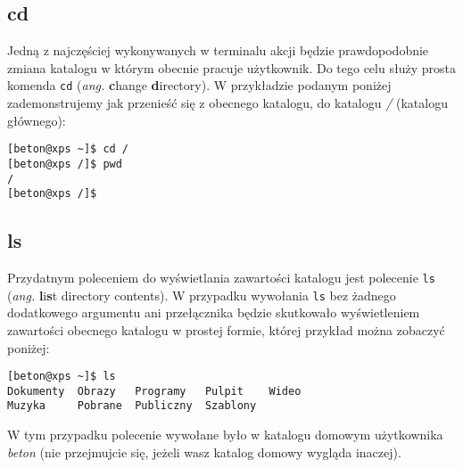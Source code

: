 \subsection{cd}
Jedną z najczęściej wykonywanych w terminalu akcji będzie prawdopodobnie zmiana katalogu w którym obecnie pracuje użytkownik. Do tego celu służy prosta komenda \texttt{cd} (\textit{ang.} \textbf{c}hange \textbf{d}irectory). W przykładzie podanym poniżej zademonstrujemy jak przenieść się z obecnego katalogu, do katalogu \textit{/} (katalogu głównego):
\begin{verbatim}
[beton@xps ~]$ cd /
[beton@xps /]$ pwd
/
[beton@xps /]$ 
\end{verbatim}

\subsection{ls}
\label{sec:ls}
Przydatnym poleceniem do wyświetlania zawartości katalogu jest polecenie \texttt{ls} (\textit{ang.} \textbf{l}i\textbf{s}t directory contents). W przypadku wywołania \texttt{ls} bez żadnego dodatkowego argumentu ani przełącznika będzie skutkowało wyświetleniem zawartości obecnego katalogu w prostej formie, której przykład można zobaczyć poniżej:
\begin{verbatim}
[beton@xps ~]$ ls
Dokumenty  Obrazy   Programy   Pulpit    Wideo
Muzyka     Pobrane  Publiczny  Szablony
\end{verbatim}
W tym przypadku polecenie wywołane było w katalogu domowym użytkownika \textit{beton} (nie przejmujcie się, jeżeli wasz katalog domowy wygląda inaczej). \newline

